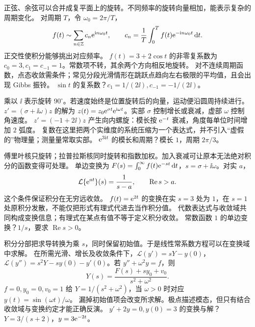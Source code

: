 \idea 正弦、余弦可以合并成复平面上的旋转。不同频率的旋转向量相加，能表示复杂的周期变化。
\mathpart 对周期 $T$，令 $\omega_0=2\pi/T$，
\[f(t)\sim\sum_{n\in\mathbb Z}c_n\mathrm e^{\mathrm i n\omega_0t},\qquad
c_n=\frac1T\int_0^T f(t)\mathrm e^{-\mathrm i n\omega_0t}\,\mathrm d t.\]
正交性使积分能够挑出对应频率。
\examplepart $f(t)=3+2\cos t$ 的非零复系数为 $c_0=3,c_1=c_{-1}=1$。常数项不转，其余两个方向相反地旋转。
\pitfall 对不连续周期函数，点态收敛需条件；常见分段光滑情形在跳跃点趋向左右极限的平均值，且会出现 Gibbs 振铃。
\exercise $\sin t$ 的复系数？$c_1=1/(2\ii),c_{-1}=-1/(2\ii)$。
\nextlesson

\idea 乘以 $\ii$ 表示旋转 $90^\circ$。若速度始终是位置旋转后的向量，运动便沿圆周持续进行。
\mathpart $z'=(\sigma+\ii\omega)z$ 的解为 $z(t)=z_0\mathrm e^{\sigma t}\mathrm e^{\mathrm i\omega t}$。实部 $\sigma$ 控制增长或衰减，虚部 $\omega$ 控制角速度。
\examplepart $z'=(-1+2\ii)z$ 产生向内螺旋：模长按 $\mathrm e^{-t}$ 衰减，角度每单位时间增加 $2$ 弧度。
\pitfall 复数在这里把两个实维度的系统压缩为一个表达式，并不引入“虚假的”物理量；测量量常取实部。
\exercise $\mathrm e^{3\mathrm i t}$ 的模长和周期？模长 $1$，周期 $2\pi/3$。
\nextlesson

\idea 傅里叶核只旋转；拉普拉斯核同时旋转和指数加权。加入衰减可让原本无法绝对积分的函数变得可处理。
\mathpart 单边变换为 $F(s)=\int_0^\infty f(t)\mathrm e^{-st}\,\mathrm d t$，$s=\sigma+\ii\omega$。对实 $a$，
\[\mathcal L\{\mathrm e^{at}\}(s)=\frac1{s-a},\qquad \operatorname{Re}s>a.\]
这个条件保证积分在无穷远收敛。
\examplepart $f(t)=\mathrm e^{2t}$ 的变换在实 $s=3$ 处为 $1$，在 $s=1$ 处原积分发散，不能仅把形式有理式代进去当作积分值。
\pitfall 代数表达式与收敛域共同构成变换信息；有理式在某点有值不等于定义积分收敛。
\exercise 常数函数 $1$ 的单边变换？$1/s$，要求 $\operatorname{Re}s>0$。
\nextlesson

\idea 积分分部把求导转换为乘 $s$，同时保留初始值。于是线性常系数方程可以在变换域中求解。
\mathpart 在所需光滑、增长及收敛条件下，$\mathcal L(y')=sY-y(0)$，$\mathcal L(y'')=s^2Y-sy(0)-y'(0)$。若 $y''+\omega^2y=f$，则
\[Y(s)=\frac{F(s)+sy_0+v_0}{s^2+\omega^2}.\]
\examplepart $f=0,y_0=0,v_0=1$ 给 $Y=1/(s^2+\omega^2)$，当 $\omega>0$ 时对应 $y(t)=\sin(\omega t)/\omega$。
\pitfall 漏掉初始值项会改变所求解。极点描述模态，但只有结合收敛域与变换约定才能正确反演。
\exercise $y'+2y=0,y(0)=3$ 的变换与解？$Y=3/(s+2)$，$y=3\mathrm e^{-2t}$。
\nextlesson

